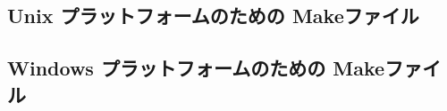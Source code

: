 \documentclass[\pformat,12pt]{jarticle}
\begin{document}
\subsection{Unix プラットフォームのための Makeファイル}



\subsection{Windows プラットフォームのための Makeファイル}



%
%
%
\end{document}

